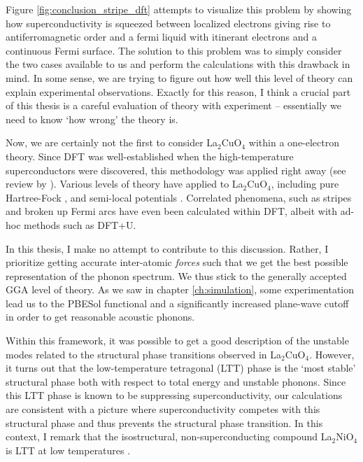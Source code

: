 Figure \ref{fig:conclusion_stripe_dft} attempts to visualize this problem by showing how superconductivity is squeezed between localized electrons giving rise to antiferromagnetic order and a fermi liquid with itinerant electrons and a continuous Fermi surface. The solution to this problem was to simply consider the two cases available to us and perform the calculations with this drawback in mind. In some sense, we are trying to figure out how well this level of theory can explain experimental observations. Exactly for this reason, I think a crucial part of this thesis is a careful evaluation of theory with experiment -- essentially we need to know `how wrong' the theory is.

Now, we are certainly not the first to consider La$_2$CuO$_4$ within a one-electron theory. Since DFT was well-established when the high-temperature superconductors were discovered, this methodology was applied right away (see review by \citeauthor{Pickett1989} \cite{Pickett1989}). Various levels of theory have applied to La$_2$CuO$_4$, including pure Hartree-Fock \cite{Su1999}, and semi-local potentials \cite{Lane2018}. Correlated phenomena, such as stripes \cite{Anisimov2004} and broken up Fermi arcs \cite{Lazic2015, Lazic2015a} have even been calculated within DFT, albeit with ad-hoc methods such as DFT+U. 

In this thesis, I make no attempt to contribute to this discussion. Rather, I prioritize getting accurate inter-atomic \emph{forces} such that we get the best possible representation of the phonon spectrum. We thus stick to the generally accepted GGA level of theory. As we saw in chapter \ref{ch:simulation}, some experimentation lead us to the PBESol functional and a significantly increased plane-wave cutoff in order to get reasonable acoustic phonons. 

Within this framework, it was possible to get a good description of the unstable modes related to the structural phase transitions observed in La$_2$CuO$_4$. However, it turns out that the low-temperature tetragonal (LTT) phase is the `most stable' structural phase both with respect to total energy and unstable phonons. Since this LTT phase is known to be suppressing superconductivity, our calculations are consistent with a picture where superconductivity competes with this structural phase and thus prevents the structural phase transition. In this context, I remark that the isostructural, non-superconducting compound La$_2$NiO$_4$ is LTT at low temperatures \cite{Tranquada1994}.

